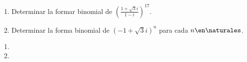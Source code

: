 \begin{enunciado}{\ejercicio}
  \begin{enumerate}[label=\alph*)]
    \item Determinar la formar binomial de
          $ \left(\frac{1 + \sqrt{3} i }{1 - i} \right)^{17}$.

    \item Determinar la forma binomial de
          $(-1 + \sqrt{3}i)^n$ para cada $n \en \naturales$.
  \end{enumerate}
\end{enunciado}

\begin{enumerate}[label=\alph*)]
  \item  \hacer

  \item \hacer
\end{enumerate}
